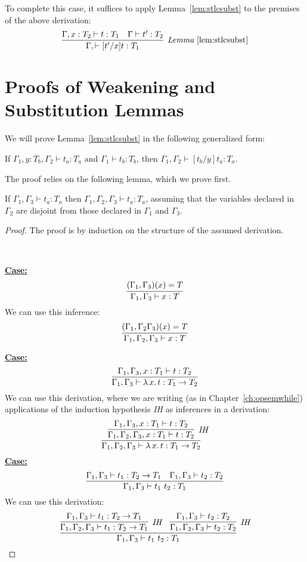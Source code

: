 \documentclass{article}
\begin{document}
\noindent To complete this case, it suffices to apply 
Lemma~\ref{lem:stlcsubst} to the premises of the above derivation:
\[
\infer[\textit{Lemma}~\ref{lem:stlcsubst}]
      {\Gamma,\vdash [t'/x]t:T_1}
      {\Gamma, x : T_2 \vdash t : T_1 & \Gamma \vdash t' : T_2}
\]


\section{Proofs of Weakening and Substitution Lemmas}
\label{sec:stlcsubst}

We will prove Lemma~\ref{lem:stlcsubst} in the following generalized form:
\begin{lemma}[Substitution]
\label{lem:stlcsubsta}
If $\Gamma_1, y:T_b, \Gamma_2 \vdash t_a : T_a$ and $\Gamma_1 \vdash t_b : T_b$, then
$\Gamma_1,\Gamma_2 \vdash [t_b/y]t_a : T_a$.
\end{lemma}

The proof relies on the
following lemma, which we prove first.

\begin{lemma}[Weakening]
\label{lem:stlcweak}
If $\Gamma_1, \Gamma_3 \vdash t_a : T_a$ then $\Gamma_1, \Gamma_2,
\Gamma_3 \vdash t_a : T_a$, assuming that the variables declared in
$\Gamma_2$ are disjoint from those declared in $\Gamma_1$ and
$\Gamma_3$.
\end{lemma}

\begin{proof}
The proof is by induction on the structure of the assumed derivation.

\ 

\noindent\underline{\textbf{Case:}}
\[
\infer{\Gamma_1,\Gamma_3\vdash x : T}{(\Gamma_1,\Gamma_3)(x) = T} 
\]
\noindent We can use this inference:
\[
\infer{\Gamma_1,\Gamma_2,\Gamma_3\vdash x : T}{(\Gamma_1,\Gamma_2\Gamma_3)(x) = T} 
\]

\noindent\underline{\textbf{Case:}}
\[
\infer{\Gamma_1,\Gamma_3\vdash \lambda\,x.\,t : T_1 \to T_2}
      {\Gamma_1,\Gamma_3,x:T_1\vdash t:T_2}
\]
\noindent We can use this derivation, where we are writing (as in Chapter~\ref{ch:opsemwhile})
applications of the induction hypothesis \textit{IH} as inferences in a derivation:
\[
\infer{\Gamma_1,\Gamma_2,\Gamma_3\vdash \lambda\,x.\,t : T_1 \to T_2}
      {\infer[\textit{IH}]{\Gamma_1,\Gamma_2,\Gamma_3,x:T_1\vdash t:T_2}{\Gamma_1,\Gamma_3,x:T_1\vdash t:T_2}}
\]
\noindent\underline{\textbf{Case:}}
\[
\infer{\Gamma_1,\Gamma_3\vdash t_1\ t_2 : T_1}
      {\Gamma_1,\Gamma_3\vdash t_1 : T_2 \to T_1 &
       \Gamma_1,\Gamma_3\vdash t_2 : T_2}
\]
\noindent We can use this derivation:
\[
\infer{\Gamma_1,\Gamma_3\vdash t_1\ t_2 : T_1}
      {\infer[\textit{IH}]{\Gamma_1,\Gamma_2,\Gamma_3\vdash t_1 : T_2 \to T_1}{\Gamma_1,\Gamma_3\vdash t_1 : T_2 \to T_1} &
       \infer[\textit{IH}]{\Gamma_1,\Gamma_2,\Gamma_3\vdash t_2 : T_2}{\Gamma_1,\Gamma_3\vdash t_2 : T_2}}
\]
\end{proof}
\end{document}
